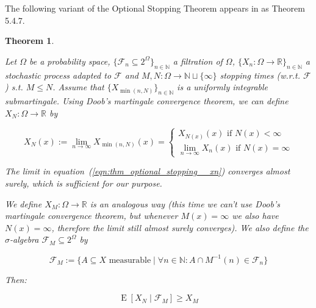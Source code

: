 \documentclass[aop,preprint]{imsart}
\numberwithin{equation}{section}
\theoremstyle{definition}
\theoremstyle{plain}
\newtheorem{theorem}{Theorem}[section]
\newcommand{\Nats}{\mathbb{N}}
\newcommand{\Reals}{\mathbb{R}}
\newcommand{\Sq}[2]{\{#1\}_{#2 \in \Nats}}
\newcommand{\Sqn}[1]{\Sq{#1}{n}}
\DeclareMathOperator{\E}{E}
\newcommand{\F}{\mathcal{F}}
\begin{document}
The following variant of the Optional Stopping Theorem appears in \cite{Durrett_2010} as Theorem 5.4.7.

\begin{samepage}
\begin{theorem}
\label{thm:optional_stopping}

Let ${\Omega}$ be a probability space, ${\Sqn{\F_n \subseteq 2^\Omega}}$ a filtration of ${\Omega}$, ${\Sqn{X_n: \Omega \rightarrow \Reals}}$ a stochastic process adapted to ${\F}$ and ${M,N: \Omega \rightarrow \Nats \sqcup \{\infty\}}$ stopping times (w.r.t. ${\F}$) s.t. ${M \leq N}$. Assume that ${\Sqn{X_{\min\left(n,N\right)}}}$ is a uniformly integrable submartingale. Using Doob's martingale convergence theorem, we can define ${X_N : \Omega \rightarrow \Reals}$ by

\begin{equation}
\label{eqn:thm_optional_stopping__xn}
X_N\left(x\right):=\lim_{n \rightarrow \infty} X_{\min\left(n,N\right)}\left(x\right)=\begin{cases}X_{N\left(x\right)}\left(x\right) \text{ if } N\left(x\right) < \infty\\\lim_{n \rightarrow \infty} X_n\left(x\right) \text{ if } N\left(x\right) = \infty\end{cases}
\end{equation}

The limit in equation~(\ref{eqn:thm_optional_stopping__xn}) converges \emph{almost} surely, which is sufficient for our purpose.

We define ${X_M: \Omega \rightarrow \Reals}$ is an analogous way (this time we can't use Doob's martingale convergence theorem, but whenever ${M\left(x\right) = \infty}$ we also have ${N\left(x\right) = \infty}$, therefore the limit still almost surely converges). We also define the $\sigma$-algebra ${\F_M \subseteq 2^\Omega}$ by

\begin{equation}
\F_M:=\{A \subseteq X \text{ measurable} \mid \forall n \in \Nats: A \cap M^{-1}\left(n\right) \in \F_n\}
\end{equation}

Then:

\begin{equation}
\E\left[X_N \mid \F_M\right] \geq X_M
\end{equation}

\end{theorem}
\end{samepage}
\end{document}
